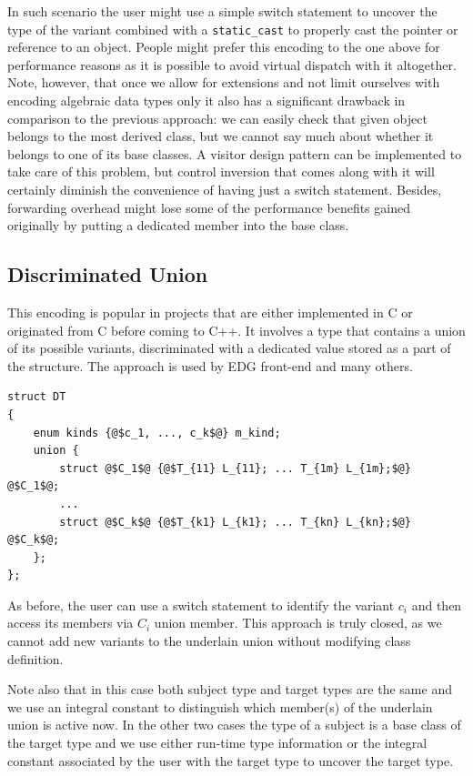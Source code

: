 \documentclass[preprint]{sigplanconf}
\makeatletter
\DeclareRobustCommand{\code}[1]{{\lstinline[breaklines=false,escapechar=@]{#1}}}
\makeatother
\begin{document}
In such scenario the user might use a simple switch statement to uncover the 
type of the variant combined with a \code{static_cast} to properly cast the 
pointer or reference to an object. People might prefer this encoding to the one 
above for performance reasons as it is possible to avoid virtual dispatch with 
it altogether. Note, however, that once we allow for extensions and not limit 
ourselves with encoding algebraic data types only it also has a significant 
drawback in comparison to the previous approach: we can easily check that given 
object belongs to the most derived class, but we cannot say much about whether 
it belongs to one of its base classes. A visitor design pattern can be 
implemented to take care of this problem, but control inversion that comes along 
with it will certainly diminish the convenience of having just a switch 
statement. Besides, forwarding overhead might lose some of the performance 
benefits gained originally by putting a dedicated member into the base class.

\subsection{Discriminated Union}
\label{sec:du}

This encoding is popular in projects that are either implemented in C or 
originated from C before coming to C++. It involves a type that contains a union 
of its possible variants, discriminated with a dedicated value stored as a part 
of the structure. The approach is used by EDG front-end\cite{EDG} and many others.

\begin{lstlisting}[keepspaces,columns=flexible]
struct DT
{
    enum kinds {@$c_1, ..., c_k$@} m_kind;
    union {
        struct @$C_1$@ {@$T_{11} L_{11}; ... T_{1m} L_{1m};$@} @$C_1$@;
        ...
        struct @$C_k$@ {@$T_{k1} L_{k1}; ... T_{kn} L_{kn};$@} @$C_k$@; 
    };
};
\end{lstlisting}

As before, the user can use a switch statement to identify the variant $c_i$ and 
then access its members via $C_i$ union member. This approach is truly closed, as 
we cannot add new variants to the underlain union without modifying class 
definition. 

Note also that in this case both subject type and target types are the same and 
we use an integral constant to distinguish which member(s) of the underlain union 
is active now. In the other two cases the type of a subject is a base class of 
the target type and we use either run-time type information or the integral 
constant associated by the user with the target type to uncover the target type. 
\end{document}
